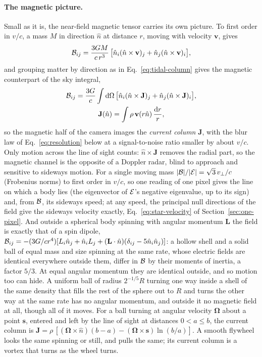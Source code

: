 \paragraph{The magnetic picture.} Small as it is, the near-field
magnetic tensor carries its own picture. To first order in $v/c$, a mass $M$ in
direction $\hat n$ at distance $r$, moving with velocity $\mathbf{v}$, gives
\begin{equation}\label{eq:magnetic-point}
\mathcal{B}_{ij} = \frac{3GM}{c\,r^{3}}\,\bigl[\hat n_i(\hat n\times\mathbf{v})_j
+ \hat n_j(\hat n\times\mathbf{v})_i\bigr],
\end{equation}
and grouping matter by direction
as in Eq.~\eqref{eq:tidal-column} gives the magnetic counterpart of the sky
integral,
\begin{equation}\label{eq:current-column}
\begin{gathered}
\mathcal{B}_{ij} = \frac{3G}{c}\int\mathrm{d}\Omega\,\bigl[\hat n_i(\hat n\times\mathbf{J})_j
+ \hat n_j(\hat n\times\mathbf{J})_i\bigr],\\
\mathbf{J}(\hat n) = \int \rho\,\mathbf{v}(r\hat n)\,\frac{\mathrm{d} r}{r} ,
\end{gathered}
\end{equation}
so the magnetic half of the camera images the \emph{current column}
$\mathbf{J}$, with the blur law of Eq.~\eqref{eq:resolution} below at a
signal-to-noise ratio smaller by about $v/c$. Only motion across the line of sight counts:
$\hat n\times\mathbf{J}$ removes the radial part, so the magnetic channel is
the opposite of a Doppler radar, blind to approach and sensitive to sideways
motion. For a single moving mass $|\mathcal{B}|/|\mathcal{E}| = \sqrt3\,v_\perp/c$ (Frobenius norms) to first order
in $v/c$, so one reading of one pixel gives the line on which a body lies (the
eigenvector of $\mathcal{E}$'s negative eigenvalue, up to its sign) and, from $\mathcal{B}$, its
sideways speed; at any speed, the principal null directions of the field give
the sideways velocity exactly, Eq.~\eqref{eq:star-velocity} of
Section~\ref{sec:one-pixel}. And outside a spherical body spinning with angular momentum
$\mathbf{L}$ the field is exactly that of a spin dipole,
$\mathcal{B}_{ij} = -(3G/cr^{4})[L_i\hat n_j + \hat n_iL_j
+ (\mathbf{L}\cdot\hat n)(\delta_{ij} - 5\hat n_i\hat n_j)]$: a hollow shell and
a solid ball of equal mass and size spinning at the same rate, whose electric
fields are identical everywhere outside them, differ in $\mathcal{B}$ by their moments
of inertia, a factor $5/3$. At equal angular momentum they are identical
outside, and so motion too can hide. A uniform ball of radius $2^{-1/5}R$
turning one way inside a shell of the same density that fills the rest of the
sphere out to $R$ and turns the other way at the same rate has no angular momentum, and outside it no magnetic field at all,
though all of it moves.
For a ball turning at angular velocity $\boldsymbol\Omega$ about a point
$\mathbf{s}$, entered and left by the line of sight at distances $0 < a \le b$,
the current column is
$\mathbf{J} = \rho\,[(\boldsymbol\Omega\times\hat n)(b-a)
- (\boldsymbol\Omega\times\mathbf{s})\ln(b/a)]$. A smooth flywheel looks the
same spinning or still, and pulls the same; its current column is a vortex
that turns as the wheel turns.

